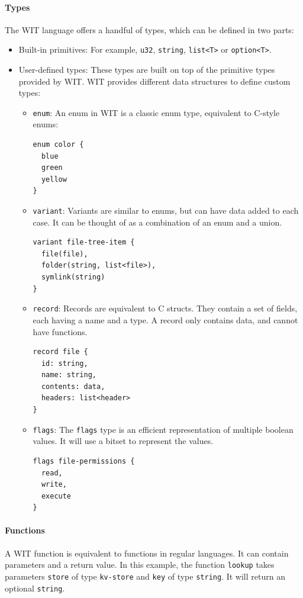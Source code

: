 \paragraph{Types}
The WIT language offers a handful of types, which can be defined in two parts:
\begin{itemize}
\item Built-in primitives: For example, \texttt{u32}, \texttt{string}, \texttt{list<T>} or \texttt{option<T>}.
\item User-defined types: These types are built on top of the primitive types provided by WIT. WIT provides different data structures to define custom types:
\begin{itemize}
\item \texttt{enum}: An enum in WIT is a classic enum type, equivalent to C-style enums:
\begin{verbatim}
enum color {
  blue
  green
  yellow
}
\end{verbatim}

\item \texttt{variant}: Variants are similar to enums, but can have data added to each case. It can be thought of as a combination of an enum and a union.
\begin{verbatim}
variant file-tree-item {
  file(file),
  folder(string, list<file>),
  symlink(string)
}
\end{verbatim}

\item \texttt{record}: Records are equivalent to C structs. They contain a set of fields, each having a name and a type. A record only contains data, and cannot have functions.
\begin{verbatim}
record file {
  id: string,
  name: string,
  contents: data,
  headers: list<header>
}
\end{verbatim}

\item \texttt{flags}: The \texttt{flags} type is an efficient representation of multiple boolean values. It will use a bitset to represent the values.

\begin{verbatim}
flags file-permissions {
  read,
  write,
  execute
}
\end{verbatim}

\end{itemize}
\end{itemize}


\paragraph{Functions}
A WIT function is equivalent to functions in regular languages. It can contain parameters and a return value.
In this example, the function \texttt{lookup} takes parameters \texttt{store} of type \texttt{kv-store} and \texttt{key} of type \texttt{string}. It will return an optional \texttt{string}.

